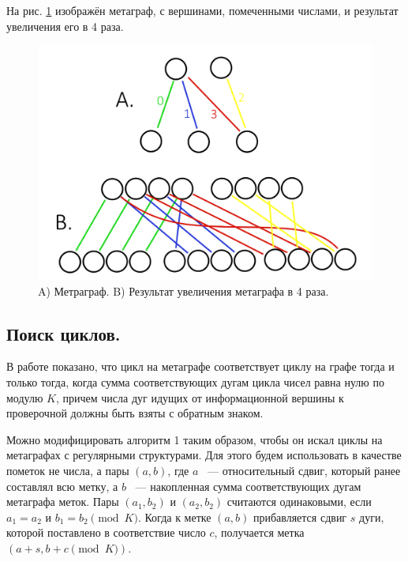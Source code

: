 \documentclass[14pt]{mmcs_article}
\begin{document}
На рис. \ref{metagraph:1} изображён метаграф, с вершинами, помеченными числами, и результат увеличения его в 4 раза.

\begin{figure}[H]
  \centering
  \includegraphics[scale=0.4]{Fig_8.png}
  \caption{ A) Метраграф. B) Результат увеличения метаграфа в 4 раза. }
  \label{metagraph:1}
\end{figure}

\subsection{Поиск циклов.}

В работе \cite{metagraphs} показано, что цикл на метаграфе соответствует циклу на графе тогда и только тогда, когда сумма соответствующих дугам цикла чисел равна нулю по модулю $K$, причем числа дуг идущих от информационной вершины к проверочной должны быть взяты с обратным знаком.

Можно модифицировать алгоритм 1 таким образом, чтобы он искал циклы на метаграфах с регулярными структурами. Для этого будем использовать в качестве пометок не числа, а пары $(a, b)$, где $a$ ~--- относительный сдвиг, который ранее составлял всю метку, а $b$ ~--- накопленная сумма соответствующих дугам метаграфа меток. Пары $(a_1, b_2)$ и $(a_2, b_2)$ считаются одинаковыми, если $a_1 = a_2$ и $b_1 = b_2 \pmod K$. Когда к метке $(a, b)$ прибавляется сдвиг $s$ дуги, которой поставлено в соответствие число $c$, получается метка $(a + s, b + c \pmod K)$.
\end{document}
